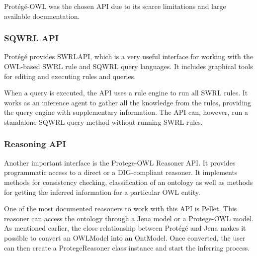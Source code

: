 Protégé-OWL was the chosen API due to its scarce limitations and large available documentation.


\subsubsection{SQWRL API}

Protégé provides SWRLAPI, which is a very useful interface for working with the OWL-based SWRL rule and SQWRL query languages. It includes graphical tools for editing and executing rules and queries.  

When a query is executed, the API uses a rule engine to run all SWRL rules. It works as an inference agent to gather all the knowledge from the rules, providing the query engine with supplementary information. The API can, however, run a standalone SQWRL query method without running SWRL rules.


\subsubsection{Reasoning API}

Another important interface is the Protege-OWL Reasoner API. It provides programmatic access to a direct or a DIG-compliant reasoner. It implements methods for consistency checking, classification of an ontology as well as methods for getting the inferred information for a particular OWL entity. 

One of the most documented reasoners to work with this API is Pellet. This reasoner can access the ontology through a Jena model or a Protege-OWL model. As mentioned earlier, the close relationship between Protégé and Jena makes it possible to convert an OWLModel into an OntModel. Once converted, the user can then create a ProtegeReasoner class instance and start the inferring process.

